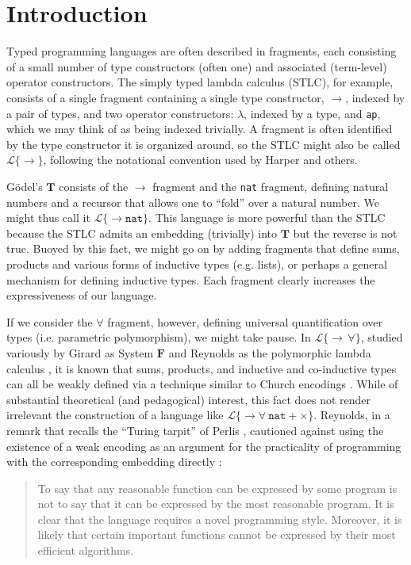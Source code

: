 \documentclass[9pt,preprint]{sigplanconf}
\begin{document}
\section{Introduction}
Typed programming languages are often described in fragments, each consisting of a small number of type constructors (often one) and associated (term-level) operator constructors. The simply typed lambda calculus (STLC), for example, consists of a single fragment containing a single type constructor, $\rightarrow$, indexed by a pair of types, and two operator constructors: $\lambda$, indexed by a type, and \verb|ap|, which we may think of as being indexed trivially. A fragment is often identified by the type constructor it is organized around, so the STLC might also be called $\mathcal{L}\{\rightarrow\}$, following the notational convention used by Harper \cite{pfpl} and others.

G\"odel's $\mathbf{T}$ consists of the $\rightarrow$ fragment and the \verb|nat| fragment, defining natural numbers and a recursor that allows one to ``fold'' over a natural number. We might thus call it $\mathcal{L}\{\rightarrow \mathtt{nat}\}$. This language is  more powerful than the STLC because the STLC admits an embedding (trivially) into  $\mathbf{T}$ but the reverse is not true. Buoyed by this fact, we might go on by adding fragments that define sums, products and various forms of inductive types (e.g. lists), or perhaps a general mechanism for defining inductive types. Each fragment clearly increases the expressiveness of our language.

If we consider the $\forall$ fragment, however, defining universal quantification over types (i.e. parametric polymorphism), we might take pause. In $\mathcal{L}\{\rightarrow\,\forall\}$, studied variously by Girard as System $\mathbf{F}$ \cite{girardF} and Reynolds as the polymorphic lambda calculus \cite{polylam}, it is known that sums, products, and inductive and co-inductive types can all be weakly defined via a technique similar to Church encodings \cite{reynolds}. While of substantial theoretical (and pedagogical) interest, this fact does not render irrelevant the construction of a language like $\mathcal{L}\{\rightarrow\forall~\mathtt{nat} + \times\}$. Reynolds, in a remark that recalls the ``Turing tarpit'' of Perlis \cite{Perl82a}, cautioned against using the existence of a weak encoding as an argument for the practicality of programming with the corresponding embedding directly \cite{Reynolds94anintroduction}: 
\begin{quote}
To say that any reasonable function can be expressed by some program is not to say that it can be expressed by the most reasonable program. It is clear that the language requires a novel programming style. Moreover, it is likely that certain important functions cannot be expressed by their most efficient algorithms.
\end{quote}
\end{document}
